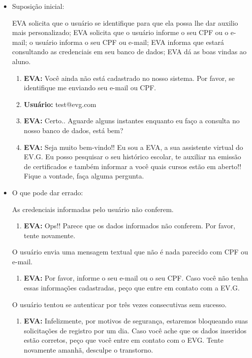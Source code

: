 \begin{itemize}
    \item Suposição inicial: 
    
        EVA solicita que o usuário se identifique para que ela possa lhe dar auxilio mais personalizado; EVA solicita que o usuário informe o seu CPF ou o e-mail; o usuário informa o seu CPF ou e-mail; EVA informa que estará consultando as credenciais em seu banco de dados; EVA dá as boas vindas ao aluno.
        
        \begin{enumerate}
            \item \textbf{EVA:} Você ainda não está cadastrado no nosso sistema. Por favor, se identifique me enviando seu e-mail ou CPF.
            \item \textbf{Usuário:} test@evg.com
            \item \textbf{EVA:} Certo.. Aguarde alguns instantes enquanto eu faço a consulta no nosso banco de dados, está bem?
            \item \textbf{EVA:} Seja muito bem-vindo!! Eu sou a EVA, a sua assistente virtual do EV.G. Eu posso pesquisar o seu histórico escolar, te auxiliar na emissão de certificados e também informar a você quais cursos estão em aberto!! Fique a vontade, faça alguma pergunta.
        \end{enumerate}
    
    \item O que pode dar errado:
    
        As credenciais informadas pelo usuário não conferem.
        \begin{enumerate}
            \item \textbf{EVA:} Ops!! Parece que os dados informados não conferem. Por favor, tente novamente.
        \end{enumerate}
        
        O usuário envia uma mensagem textual que não é nada parecido com CPF ou e-mail.
        \begin{enumerate}
            \item \textbf{EVA:} Por favor, informe o seu e-mail ou o seu CPF. Caso você não tenha essas informações cadastradas, peço que entre em contato com a EV.G.
        \end{enumerate}
        
        O usuário tentou se autenticar por três vezes consecutivas sem sucesso.
        \begin{enumerate}
            \item \textbf{EVA:} Infelizmente, por motivos de segurança, estaremos bloqueando suas solicitações de registro por um dia. Caso você ache que os dados inseridos estão corretos, peço que você entre em contato com o EVG. Tente novamente amanhã, desculpe o transtorno.
        \end{enumerate}
        

\end{itemize}
